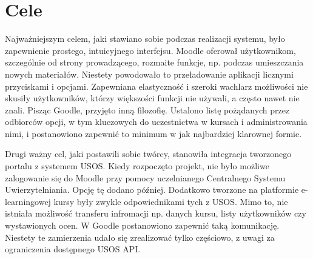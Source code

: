 \documentclass{pracamgr}
\begin{document}
\section{Cele}

Najważniejszym celem, jaki stawiano sobie podczas realizacji systemu, było
zapewnienie prostego, intuicyjnego interfejsu. Moodle oferował użytkownikom,
szczególnie od strony prowadzącego, rozmaite funkcje, np. podczas umieszczania
nowych materiałów. Niestety powodowało to przeładowanie aplikacji licznymi
przyciskami i opcjami. Zapewniana elastyczność i szeroki wachlarz możliwości
nie skusiły użytkowników, którzy większości funkcji nie używali, a często
nawet nie znali. Pisząc Goodle, przyjęto inną filozofię. Ustalono listę
pożądanych przez odbiorców opcji, w tym kluczowych do uczestnictwa w kursach
i administrowania nimi, i postanowiono zapewnić to minimum w jak najbardziej
klarownej formie. 

Drugi ważny cel, jaki postawili sobie twórcy, stanowiła integracja
tworzonego portalu z systemem USOS. Kiedy rozpoczęto projekt, nie było
możliwe zalogowanie się do Moodle przy pomocy uczelnianego Centralnego
Systemu Uwierzytelniania. Opcję tę dodano później. Dodatkowo tworzone na
platformie e-learningowej kursy były zwykle odpowiednikami tych z USOS. Mimo
to, nie istniała możliwość transferu infromacji np. danych kursu, listy
użytkowników czy wystawionych ocen. W Goodle postanowiono zapewnić taką 
komunikację. Niestety te zamierzenia udało się zrealizować tylko
częściowo, z uwagi za ograniczenia dostępnego USOS API.   

%
%

%
\end{document}
